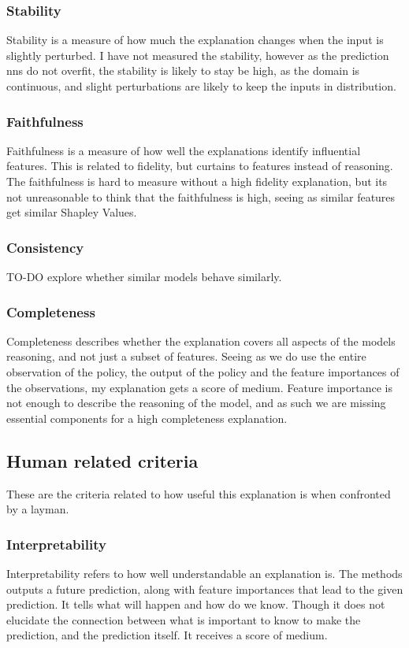 \documentclass[UKenglish]{uiomasterthesis}
\begin{document}
\subsubsection{Stability}
Stability is a measure of how much the explanation changes when the input is slightly perturbed. I have not measured the stability, however as the prediction \acp{nn} do not overfit, the stability is likely to stay be high, as the domain is continuous, and slight perturbations are likely to keep the inputs in distribution.

\subsubsection{Faithfulness}
Faithfulness is a measure of how well the explanations identify influential features. This is related to fidelity, but curtains to features instead of reasoning. The faithfulness is hard to measure without a high fidelity explanation, but its not unreasonable to think that the faithfulness is high, seeing as similar features get similar Shapley Values.


\subsubsection{Consistency}
TO-DO explore whether similar models behave similarly.

\subsubsection{Completeness}
Completeness describes whether the explanation covers all aspects of the models reasoning, and not just a subset of features. Seeing as we do use the entire observation of the policy, the output of the policy and the feature importances of the observations, my explanation gets a score of medium. Feature importance is not enough to describe the reasoning of the model, and as such we are missing essential components for a high completeness explanation.

\subsection{Human related criteria}
These are the criteria related to how useful this explanation is when confronted by a layman.

\subsubsection{Interpretability}
Interpretability refers to how well understandable an explanation is. The methods outputs a future prediction, along with feature importances that lead to the given prediction. It tells what will happen and how do we know. Though it does not elucidate the connection between what is important to know to make the prediction, and the prediction itself. It receives a score of medium.
\end{document}
